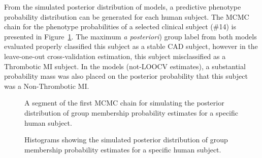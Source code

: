 \begin{DoubleSpace*}
From the simulated posterior distribution of models, a predictive phenotype probability distribution can be generated for each human subject. The MCMC chain for the phenotype probabilities of a selected clinical subject (\#14) is presented in Figure~\ref{fig:ptid2010MCMC}. The maximum \emph{a posteriori}) group label from both models evaluated properly classified this subject as a stable CAD subject, however in the leave-one-out cross-validation estimation, this subject misclassified as a Thrombotic MI subject. In the models (not-LOOCV estimates), a substantial probability mass was also placed on the posterior probability that this subject was a Non-Thrombotic MI.  

\begin{figure}[H]
	\caption[A segment of the first MCMC chain for simulating the posterior distribution of group membership probability estimates for a specific human subject. ]{\DoubleSpacing A segment of the first MCMC chain for simulating the posterior distribution of group membership probability estimates for a specific human subject.  \label{fig:ptid2010MCMC} }
\end{figure}

\begin{figure}[H]
	\caption[Histograms showing the simulated posterior distribution of group membership probability estimates for a specific human subject]{\DoubleSpacing Histograms showing the simulated posterior distribution of group membership probability estimates for a specific human subject. \label{fig:ptid2010Hist} }
\end{figure}
 

\end{DoubleSpace*}

